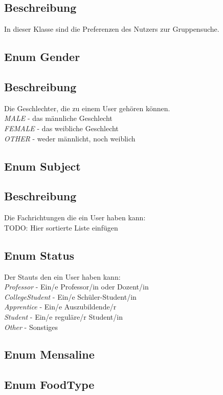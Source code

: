 \documentclass[a4paper]{scrreprt}
\begin{document}
\subsection*{Beschreibung}
In dieser Klasse sind die Preferenzen des Nutzers zur Gruppensuche.


\subsection{Enum Gender}
\subsection*{Beschreibung}
Die Geschlechter, die zu einem User gehören können. \\
\textit{MALE} - das männliche Geschlecht \\
\textit{FEMALE} - das weibliche Geschlecht \\
\textit{OTHER} - weder männlicht, noch weiblich \\

\subsection{Enum Subject}
\subsection*{Beschreibung}
Die Fachrichtungen die ein User haben kann: \\
TODO: Hier sortierte Liste einfügen

\subsection{Enum Status}
Der Stauts den ein User haben kann: \\
\textit{Professor} - Ein/e Professor/in oder Dozent/in \\
\textit{CollegeStudent} -  Ein/e Schüler-Student/in \\
\textit{Apprentice} - Ein/e Auszubildende/r \\
\textit{Student} - Ein/e reguläre/r Student/in \\
\textit{Other} - Sonstiges \\

\subsection{Enum Mensaline}

\subsection{Enum FoodType}
\end{document}
